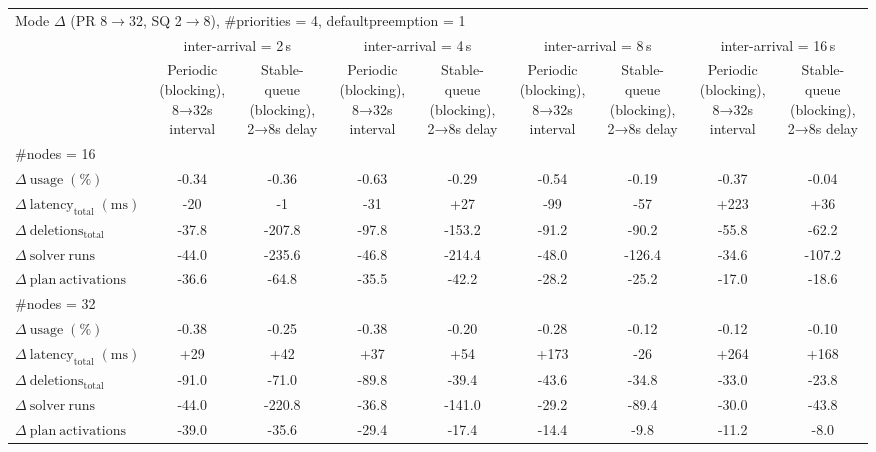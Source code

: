 
\begin{tabular}{l c c c c c c c c}
\toprule
\multicolumn{9}{l}{Mode $\Delta$ (PR 8$\rightarrow$32, SQ 2$\rightarrow$8), \#priorities = 4, defaultpreemption = 1} \\
\addlinespace[0.2em]
 & \multicolumn{2}{c}{inter-arrival = 2\,s} & \multicolumn{2}{c}{inter-arrival = 4\,s} & \multicolumn{2}{c}{inter-arrival = 8\,s} & \multicolumn{2}{c}{inter-arrival = 16\,s} \\
\cmidrule(lr){2-3}\cmidrule(lr){4-5}\cmidrule(lr){6-7}\cmidrule(lr){8-9}
 & Periodic (blocking), 8→32s interval & Stable-queue (blocking), 2→8s delay & Periodic (blocking), 8→32s interval & Stable-queue (blocking), 2→8s delay & Periodic (blocking), 8→32s interval & Stable-queue (blocking), 2→8s delay & Periodic (blocking), 8→32s interval & Stable-queue (blocking), 2→8s delay \\
\midrule
\multicolumn{9}{l}{\#nodes = 16} \\
\midrule
$\Delta\ \mathrm{usage}\;(\%)$ & -0.34 & -0.36 & -0.63 & -0.29 & -0.54 & -0.19 & -0.37 & -0.04 \\
$\Delta\ \mathrm{latency}_{\mathrm{total}}\;(\mathrm{ms})$ & -20 & -1 & -31 & +27 & -99 & -57 & +223 & +36 \\
$\Delta\ \mathrm{deletions}_{\mathrm{total}}$ & -37.8 & -207.8 & -97.8 & -153.2 & -91.2 & -90.2 & -55.8 & -62.2 \\
$\Delta\ \mathrm{solver\ runs}$ & -44.0 & -235.6 & -46.8 & -214.4 & -48.0 & -126.4 & -34.6 & -107.2 \\
$\Delta\ \mathrm{plan\ activations}$ & -36.6 & -64.8 & -35.5 & -42.2 & -28.2 & -25.2 & -17.0 & -18.6 \\
\midrule
\multicolumn{9}{l}{\#nodes = 32} \\
\midrule
$\Delta\ \mathrm{usage}\;(\%)$ & -0.38 & -0.25 & -0.38 & -0.20 & -0.28 & -0.12 & -0.12 & -0.10 \\
$\Delta\ \mathrm{latency}_{\mathrm{total}}\;(\mathrm{ms})$ & +29 & +42 & +37 & +54 & +173 & -26 & +264 & +168 \\
$\Delta\ \mathrm{deletions}_{\mathrm{total}}$ & -91.0 & -71.0 & -89.8 & -39.4 & -43.6 & -34.8 & -33.0 & -23.8 \\
$\Delta\ \mathrm{solver\ runs}$ & -44.0 & -220.8 & -36.8 & -141.0 & -29.2 & -89.4 & -30.0 & -43.8 \\
$\Delta\ \mathrm{plan\ activations}$ & -39.0 & -35.6 & -29.4 & -17.4 & -14.4 & -9.8 & -11.2 & -8.0 \\
\bottomrule
\end{tabular}


